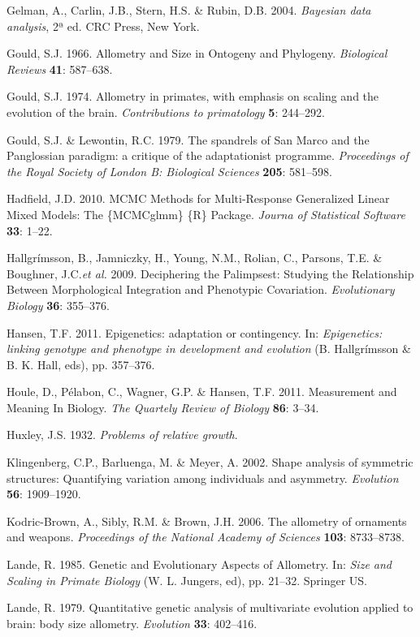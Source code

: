 \documentclass[12pt,]{article}
\begin{document}
Gelman, A., Carlin, J.B., Stern, H.S. \& Rubin, D.B. 2004.
\emph{Bayesian data analysis}, 2ª ed. CRC Press, New York.

Gould, S.J. 1966. Allometry and Size in Ontogeny and Phylogeny.
\emph{Biological Reviews} \textbf{41}: 587--638.

Gould, S.J. 1974. Allometry in primates, with emphasis on scaling and
the evolution of the brain. \emph{Contributions to primatology}
\textbf{5}: 244--292.

Gould, S.J. \& Lewontin, R.C. 1979. The spandrels of San Marco and the
Panglossian paradigm: a critique of the adaptationist programme.
\emph{Proceedings of the Royal Society of London B: Biological Sciences}
\textbf{205}: 581--598.

Hadfield, J.D. 2010. MCMC Methods for Multi-Response Generalized Linear
Mixed Models: The \{MCMCglmm\} \{R\} Package. \emph{Journa of
Statistical Software} \textbf{33}: 1--22.

Hallgrímsson, B., Jamniczky, H., Young, N.M., Rolian, C., Parsons, T.E.
\& Boughner, J.C.\emph{et al.} 2009. Deciphering the Palimpsest:
Studying the Relationship Between Morphological Integration and
Phenotypic Covariation. \emph{Evolutionary Biology} \textbf{36}:
355--376.

Hansen, T.F. 2011. Epigenetics: adaptation or contingency. In:
\emph{Epigenetics: linking genotype and phenotype in development and
evolution} (B. Hallgrímsson \& B. K. Hall, eds), pp. 357--376.

Houle, D., Pélabon, C., Wagner, G.P. \& Hansen, T.F. 2011. Measurement
and Meaning In Biology. \emph{The Quartely Review of Biology}
\textbf{86}: 3--34.

Huxley, J.S. 1932. \emph{Problems of relative growth}.

Klingenberg, C.P., Barluenga, M. \& Meyer, A. 2002. Shape analysis of
symmetric structures: Quantifying variation among individuals and
asymmetry. \emph{Evolution} \textbf{56}: 1909--1920.

Kodric-Brown, A., Sibly, R.M. \& Brown, J.H. 2006. The allometry of
ornaments and weapons. \emph{Proceedings of the National Academy of
Sciences} \textbf{103}: 8733--8738.

Lande, R. 1985. Genetic and Evolutionary Aspects of Allometry. In:
\emph{Size and Scaling in Primate Biology} (W. L. Jungers, ed), pp.
21--32. Springer US.

Lande, R. 1979. Quantitative genetic analysis of multivariate evolution
applied to brain: body size allometry. \emph{Evolution} \textbf{33}:
402--416.
\end{document}
